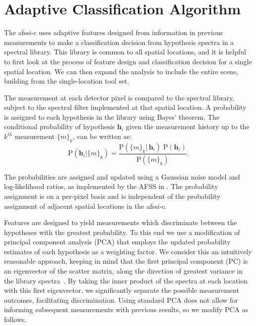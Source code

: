\section{Adaptive Classification Algorithm}


The \gls{afssi-c} uses adaptive features designed from information in previous measurements to make a classification decision from hypothesis spectra in a spectral library. This library is common to all spatial locations, and it is helpful to first look at the process of feature design and classification decision for a single spatial location. We can then expand the analysis to include the entire scene, building from the single-location tool set.

The measurement at each detector pixel is compared to the spectral library, subject to the spectral filter implemented at that spatial location. A probability is assigned to each hypothesis in the library using Bayes' theorem. The conditional probability of hypothesis $\textbf{h}_i$ given the measurement history up to the $k^{th}$ measurement $\{m\}_k$, can be written as:
%
\begin{equation}\label{eq:BayesThm}
\mbox{P} \left( \textbf{h}_i | \{ m \}_k \right) = \frac{\mbox{P} \left( \{m\}_k |\, \textbf{h}_i \right) \; \mbox{P} \left(\textbf{h}_i\right)}{\mbox{P} \left( \{m\}_k \right)}.
\end{equation}

The probabilities are assigned and updated using a Gaussian noise model and log-likelihood ratios, as implemented by the AFSS in \cite{AFSSbetter}. The probability assignment is on a per-pixel basis and is independent of the probability assignment of adjacent spatial locations in the \gls{afssi-c}.

Features are designed to yield measurements which discriminate between the hypotheses with the greatest probability. To this end we use a modification of principal component analysis (PCA) that employs the updated probability estimates of each hypothesis as a weighting factor. We consider this an intuitively reasonable approach, keeping in mind that the first principal component (PC) is an eigenvector of the scatter matrix, along the direction of greatest variance in the library spectra~\cite{PCAwiley}. By taking the inner product of the spectra at each location with this first eigenvector, we significantly separate the possible measurement outcomes, facilitating discrimination. Using standard PCA does not allow for informing subsequent measurements with previous results, so we modify PCA as follows.

